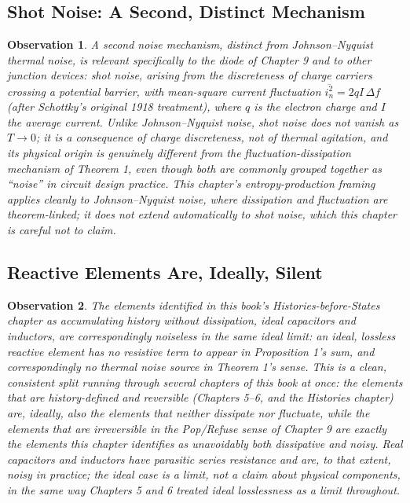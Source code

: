 \documentclass[12pt]{article}
\newtheorem{observation}{Observation}
\begin{document}
\subsection{Shot Noise: A Second, Distinct Mechanism}

\begin{observation}
A second noise mechanism, distinct from Johnson--Nyquist thermal noise, is relevant specifically to the diode of Chapter 9 and to other junction devices: shot noise, arising from the discreteness of charge carriers crossing a potential barrier, with mean-square current fluctuation $\overline{i_n^2} = 2qI\,\Delta f$ (after Schottky's original 1918 treatment), where $q$ is the electron charge and $I$ the average current. Unlike Johnson--Nyquist noise, shot noise does not vanish as $T \to 0$; it is a consequence of charge discreteness, not of thermal agitation, and its physical origin is genuinely different from the fluctuation-dissipation mechanism of Theorem 1, even though both are commonly grouped together as ``noise'' in circuit design practice. This chapter's entropy-production framing applies cleanly to Johnson--Nyquist noise, where dissipation and fluctuation are theorem-linked; it does not extend automatically to shot noise, which this chapter is careful not to claim.
\end{observation}

\subsection{Reactive Elements Are, Ideally, Silent}

\begin{observation}
The elements identified in this book's Histories-before-States chapter as accumulating history without dissipation, ideal capacitors and inductors, are correspondingly noiseless in the same ideal limit: an ideal, lossless reactive element has no resistive term to appear in Proposition 1's sum, and correspondingly no thermal noise source in Theorem 1's sense. This is a clean, consistent split running through several chapters of this book at once: the elements that are history-defined and reversible (Chapters 5--6, and the Histories chapter) are, ideally, also the elements that neither dissipate nor fluctuate, while the elements that are irreversible in the Pop/Refuse sense of Chapter 9 are exactly the elements this chapter identifies as unavoidably both dissipative and noisy. Real capacitors and inductors have parasitic series resistance and are, to that extent, noisy in practice; the ideal case is a limit, not a claim about physical components, in the same way Chapters 5 and 6 treated ideal losslessness as a limit throughout.
\end{observation}
\end{document}
